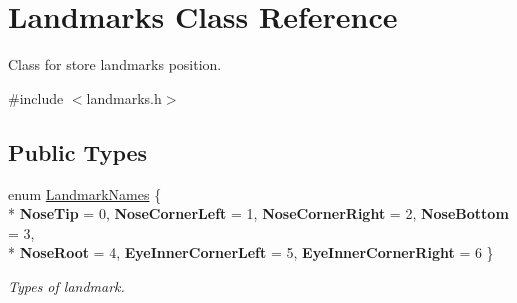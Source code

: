 \hypertarget{class_landmarks}{\section{Landmarks Class Reference}
\label{class_landmarks}
}


Class for store landmarks position.  




{\ttfamily \#include $<$landmarks.\+h$>$}

\subsection*{Public Types}
\begin{DoxyCompactItemize}
\item 
\hypertarget{class_landmarks_a69362bef3ef2209cb2304ff7ea2ce91e}{enum \hyperlink{class_landmarks_a69362bef3ef2209cb2304ff7ea2ce91e}{Landmark\+Names} \{ \\*
{\bfseries Nose\+Tip} = 0, 
{\bfseries Nose\+Corner\+Left} = 1, 
{\bfseries Nose\+Corner\+Right} = 2, 
{\bfseries Nose\+Bottom} = 3, 
\\*
{\bfseries Nose\+Root} = 4, 
{\bfseries Eye\+Inner\+Corner\+Left} = 5, 
{\bfseries Eye\+Inner\+Corner\+Right} = 6
 \}}\label{class_landmarks_a69362bef3ef2209cb2304ff7ea2ce91e}

\begin{DoxyCompactList}\small\item\em Types of landmark. \end{DoxyCompactList}\end{DoxyCompactItemize}
